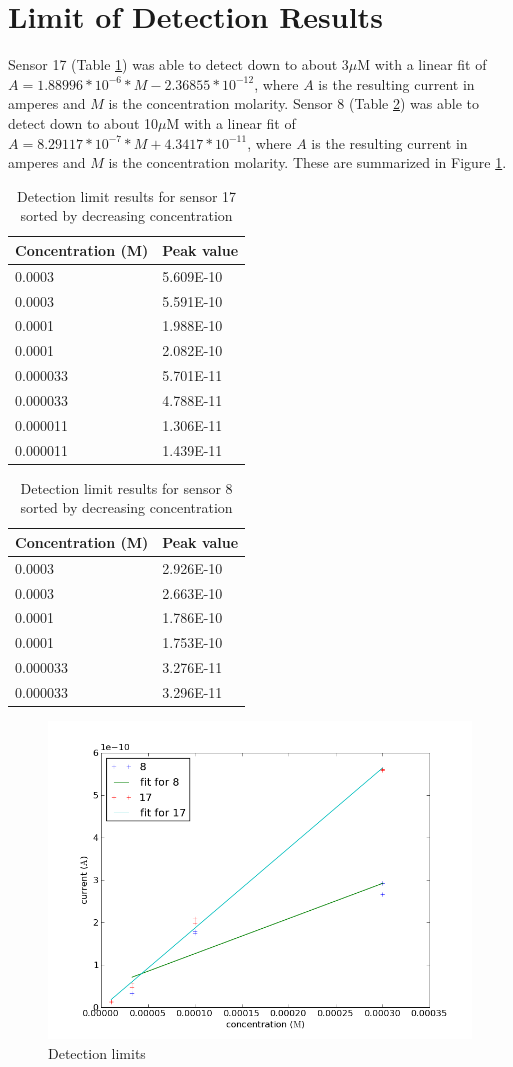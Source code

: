 \section{Limit of Detection Results}

Sensor 17 (Table \ref{limit 17}) was able to detect down to about 3$\mu$M with a linear fit of $A = 1.88996 * 10^{-6} * M - 2.36855 * 10^{-12}$, where $A$ is the resulting current in amperes and $M$ is the concentration molarity. Sensor 8 (Table \ref{limit 8}) was able to detect down to about 10$\mu$M with a linear fit of $A = 8.29117 * 10^{-7} * M + 4.3417 * 10^{-11}$, where $A$ is the resulting current in amperes and $M$ is the concentration molarity. These are summarized in Figure \ref{limit figure}.

\begin{table}
	\begin{tabular}{ll}
		Concentration (M) & Peak value \\
		\hline
		0.0003 & 5.609E-10 \\
		0.0003 & 5.591E-10 \\
		0.0001 & 1.988E-10 \\
		0.0001 & 2.082E-10 \\
		0.000033 & 5.701E-11 \\
		0.000033 & 4.788E-11 \\
		0.000011 & 1.306E-11 \\
		0.000011 & 1.439E-11 \\
	\end{tabular}
	\caption[Detection limit results for sensor 17]{Detection limit results for sensor 17 sorted by decreasing concentration}
	\label{limit 17}
\end{table}

\begin{table}
	\begin{tabular}{ll}
		Concentration (M) & Peak value \\
		\hline
		0.0003 & 2.926E-10 \\
		0.0003 & 2.663E-10 \\
		0.0001 & 1.786E-10 \\
		0.0001 & 1.753E-10 \\
		0.000033 & 3.276E-11 \\
		0.000033 & 3.296E-11 \\
	\end{tabular}
	\caption[Detection limit results for sensor 8]{Detection limit results for sensor 8 sorted by decreasing concentration}
	\label{limit 8}
\end{table}

\begin{figure}
	\centering
	\includegraphics[width=0.7\linewidth]{figures/limit.png}
	\caption{Detection limits}
	\label{limit figure}
\end{figure}
